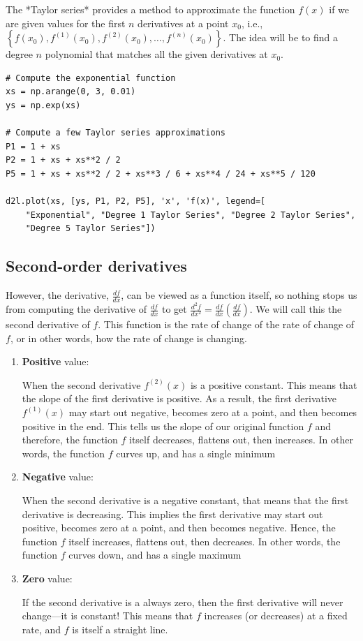 The *Taylor series* provides a method to approximate the function $f(x)$ if we
are given values for the first $n$ derivatives at a point $x_0$, i.e., $\left\{
f(x_0), f^{(1)}(x_0), f^{(2)}(x_0), \ldots, f^{(n)}(x_0) \right\}$. The idea
will be to find a degree $n$ polynomial that matches all the given derivatives
at $x_0$.

\begin{lstlisting}
# Compute the exponential function
xs = np.arange(0, 3, 0.01)
ys = np.exp(xs)

# Compute a few Taylor series approximations
P1 = 1 + xs
P2 = 1 + xs + xs**2 / 2
P5 = 1 + xs + xs**2 / 2 + xs**3 / 6 + xs**4 / 24 + xs**5 / 120

d2l.plot(xs, [ys, P1, P2, P5], 'x', 'f(x)', legend=[
    "Exponential", "Degree 1 Taylor Series", "Degree 2 Taylor Series",
    "Degree 5 Taylor Series"])
\end{lstlisting}

\subsection{Second-order derivatives}


However, the derivative, $\frac{df}{dx}$, can be viewed as a function itself, so
nothing stops us from computing the derivative of $\frac{df}{dx}$ to get
$\frac{d^2f}{dx^2} = \frac{df}{dx}\left(\frac{df}{dx}\right)$.  We will call
this the second derivative of $f$.  This function is the rate of change of the
rate of change of $f$, or in other words, how the rate of change is changing.

\begin{enumerate}
  \item   {\bf Positive} value: 
  
  When the second derivative $f^{(2)}(x)$ is a positive constant.  This means
  that the slope of the first derivative is positive.  As a result, the first
  derivative $f^{(1)}(x)$ may start out negative, becomes zero at a point, and
  then becomes positive in the end. This tells us the slope of our original
  function $f$ and therefore, the function $f$ itself decreases, flattens out,
  then increases.  In other words, the function $f$ curves up, and has a single
  minimum
  
  \item {\bf Negative} value:
  
  When the second derivative is a negative constant, that means that the first
  derivative is decreasing.  This implies the first derivative may start out
  positive, becomes zero at a point, and then becomes negative. Hence, the
  function $f$ itself increases, flattens out, then decreases.  In other words,
  the function $f$ curves down, and has a single maximum
  
  \item {\bf Zero} value:
  
  If the second derivative is a always zero, then the first derivative will
  never change---it is constant! This means that $f$ increases (or decreases) at
  a fixed rate, and $f$ is itself a straight line.
  
\end{enumerate}


